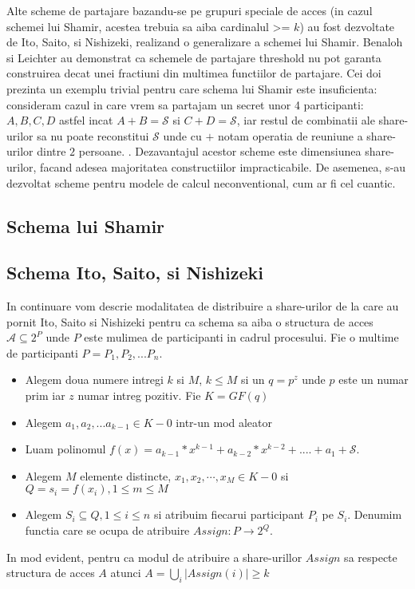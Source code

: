 \documentclass{llncs}
\begin{document}
Alte scheme de partajare bazandu-se pe grupuri speciale de acces (in cazul schemei lui Shamir, acestea trebuia sa aiba cardinalul >= $k$) au fost dezvoltate de Ito, Saito, si Nishizeki, realizand o generalizare a schemei lui Shamir. \cite{ITO:1989}
Benaloh si Leichter au demonstrat ca schemele de partajare threshold nu pot garanta construirea decat unei fractiuni din multimea functiilor de partajare. Cei doi prezinta un exemplu trivial pentru care schema lui Shamir este insuficienta: consideram cazul in care vrem sa partajam un secret unor 4 participanti: $A, B, C, D$ astfel incat $A + B = \mathcal{S}$ si $C + D = \mathcal{S}$, iar restul de combinatii ale share-urilor sa nu poate reconstitui $\mathcal{S}$ unde cu $+$ notam operatia de reuniune a share-urilor dintre $2$ persoane. \cite{JJ:1990}.
Dezavantajul acestor scheme este dimensiunea share-urilor, facand adesea majoritatea constructiilor impracticabile. \cite{Survey:2011}
De asemenea, s-au dezvoltat scheme pentru modele de calcul neconventional, cum ar fi cel cuantic. \cite{hillery:1999}

\subsection{Schema lui Shamir}

\subsection{Schema Ito, Saito, si Nishizeki}
\label{Ito}

In continuare vom descrie modalitatea de distribuire a share-urilor de la care au pornit Ito, Saito si Nishizeki pentru ca schema sa aiba o structura de acces $\mathcal{A} \subseteq 2^P$ unde $P$ este mulimea de participanti in cadrul procesului.
Fie o multime de participanti $P = {P_1, P_2, ... P_n}$. 
\begin{itemize}
	\item Alegem doua numere intregi $k$ si $M$, $k \leq M$ si un $q = p^z$ unde $p$ este un numar prim iar $z$ numar intreg pozitiv. Fie $K = GF(q)$
	\item Alegem $a_1, a_2, ...a_{k-1} \in K - {0}$ intr-un mod aleator
	\item Luam polinomul $f(x) = a_{k-1} * x ^ {k-1} + a_{k-2} * x ^ {k - 2} + .... + a_1 + \mathcal{S}$.
	\item Alegem $M$ elemente distincte, $x_1, x_2, \cdots, x_M \in K - {0}$ si $Q = {s_i = f(x_i), 1 \leq m \leq M}$
	\item Alegem $S_i \subseteq Q, 1 \leq i \leq n$ si atribuim fiecarui participant $P_i$ pe $S_i$.
	Denumim functia care se ocupa de atribuire $Assign: P \rightarrow 2^Q$. \cite{ITO:1989}
\end{itemize}
In mod evident, pentru ca modul de atribuire a share-urillor $Assign$ sa respecte structura de acces $A$ atunci
$A = { \underset{i}{{\bigcup}} } |Assign(i)| \geq k$
\end{document}
